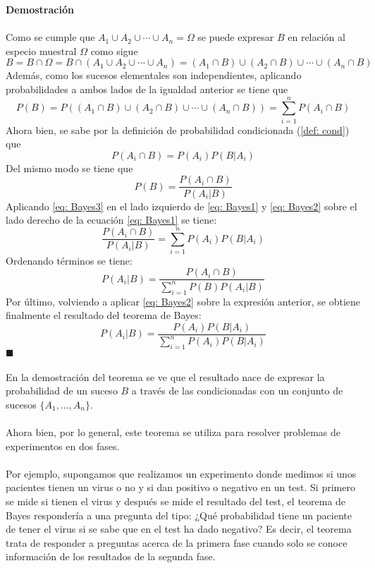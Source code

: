\textbf{Demostración}\\\\
Como se cumple que $A_1 \cup A_2 \cup \cdots \cup A_n = \Omega$
se puede expresar $B$ en relación al especio muestral $\Omega$ como sigue
$$B = B \cap \Omega = B \cap (A_1 \cup A_2 \cup \cdots \cup A_n) = (A_1 \cap B) \cup (A_2 \cap B) \cup \cdots \cup (A_n \cap B)$$
Además, como los sucesos elementales son independientes, aplicando probabilidades a ambos lados de la igualdad anterior se tiene que 
\begin{equation}
P(B) = P((A_1 \cap B) \cup (A_2 \cap B) \cup \cdots \cup (A_n \cap B)) = \sum_{i=1}^n{P(A_i \cap B)}
\label{eq: Bayes1}
\end{equation}
Ahora bien, se sabe por la definición de probabilidad condicionada (\ref{def: cond}) que 
\begin{equation}
P(A_i \cap B) = P(A_i)P(B|A_i)
\label{eq: Bayes2}
\end{equation} 
Del mismo modo se tiene que
\begin{equation}
P(B) = \frac{P(A_i \cap B)}{P(A_i|B)}
\label{eq: Bayes3}
\end{equation}  
Aplicando \ref{eq: Bayes3} en el lado izquierdo de \ref{eq: Bayes1} y \ref{eq: Bayes2} sobre el lado derecho de la ecuación \ref{eq: Bayes1} se tiene:
$$\frac{P(A_i \cap B)}{P(A_i|B)} = \sum_{i=1}^n{P(A_i)P(B|A_i)}$$
Ordenando términos se tiene:
$$P(A_i|B) = \frac{P(A_i \cap B)}{\sum_{i=1}^n{P(B)P(A_i|B)}}$$
Por último, volviendo a aplicar \ref{eq: Bayes2} sobre la expresión anterior, se obtiene finalmente el resultado del teorema de Bayes:
$$P(A_i| B) = \frac{P(A_i)P(B|A_i)}{\sum_{i=1}^{n}{P(A_i)P(B|A_i)}}$$
$ \blacksquare $\\\\
En la demostración del teorema se ve que el resultado nace de expresar la probabilidad de un suceso $B$ a través de las condicionadas con un conjunto de sucesos $\lbrace A_1,\ldots, A_n\rbrace$.\\\\
Ahora bien, por lo general, este teorema se utiliza para resolver problemas de experimentos en dos fases.\\\\
Por ejemplo, supongamos que realizamos un experimento donde medimos si unos pacientes tienen un virus o no y si dan positivo o negativo en un test. Si primero se mide si tienen el virus y después se mide el resultado del test, el teorema de Bayes respondería a una pregunta del tipo: ¿Qué probabilidad tiene un paciente de tener el virus si se sabe que en el test ha dado negativo? Es decir, el teorema trata de responder a preguntas acerca de la primera fase cuando solo se conoce información de los resultados de la segunda fase.
